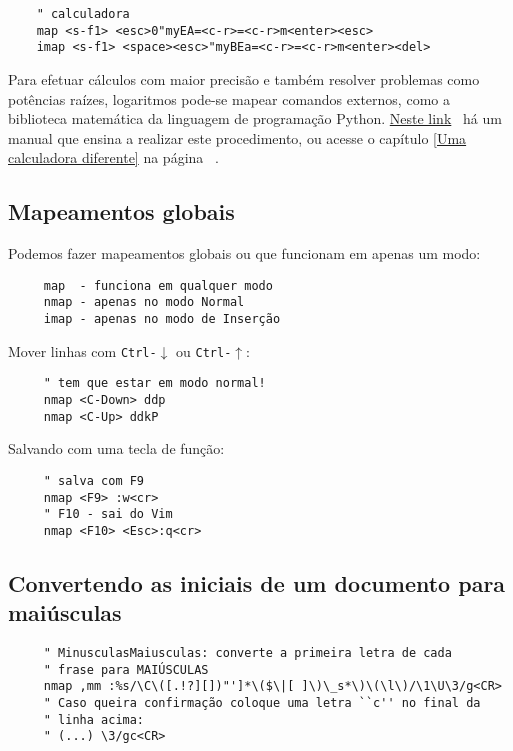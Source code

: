 \begin{verbatim}
    " calculadora
    map <s-f1> <esc>0"myEA=<c-r>=<c-r>m<enter><esc>
    imap <s-f1> <space><esc>"myBEa=<c-r>=<c-r>m<enter><del>
\end{verbatim}

Para efetuar cálculos com maior precisão e também resolver problemas como
potências raízes, logaritmos pode-se mapear comandos externos, como a
biblioteca matemática da linguagem de programação Python.
\href{http://vim.wikia.com/wiki/Scientific\_calculator}{Neste link}~\cite{CientificCalculator} há um
manual que ensina a realizar este procedimento, ou acesse o capítulo \ref{Uma
calculadora diferente} na página~ \pageref{Uma calculadora diferente}.


\subsection{Mapeamentos globais}


Podemos fazer mapeamentos globais ou que funcionam em apenas um modo:

\begin{verbatim}
     map  - funciona em qualquer modo
     nmap - apenas no modo Normal
     imap - apenas no modo de Inserção
\end{verbatim}

Mover linhas com {\tt Ctrl-$\downarrow$} ou {\tt Ctrl-$\uparrow$}:

\begin{verbatim}
     " tem que estar em modo normal!
     nmap <C-Down> ddp
     nmap <C-Up> ddkP
\end{verbatim}

Salvando com uma tecla de função:

\begin{verbatim}
     " salva com F9
     nmap <F9> :w<cr>
     " F10 - sai do Vim
     nmap <F10> <Esc>:q<cr>
\end{verbatim}

\subsection{Convertendo as iniciais de um documento para maiúsculas}
\label{Convertendo as iniciais de um documento para maiúsculas}

\begin{verbatim}
     " MinusculasMaiusculas: converte a primeira letra de cada
     " frase para MAIÚSCULAS
     nmap ,mm :%s/\C\([.!?][])"']*\($\|[ ]\)\_s*\)\(\l\)/\1\U\3/g<CR>
     " Caso queira confirmação coloque uma letra ``c'' no final da 
     " linha acima:
     " (...) \3/gc<CR>
\end{verbatim}

